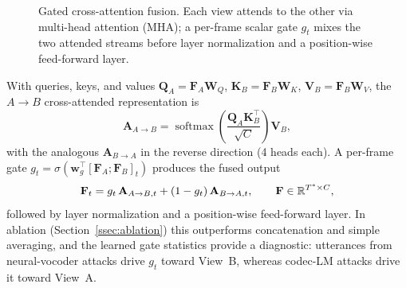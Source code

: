 \begin{figure}[t]
\centering
{}
\caption{Gated cross-attention fusion. Each view attends to the other via multi-head
attention (MHA); a per-frame scalar gate $g_t$ mixes the two attended streams before
layer normalization and a position-wise feed-forward layer.}
\label{fig:fusion}
\end{figure}

With queries, keys, and values $\mathbf{Q}_A = \mathbf{F}_A \mathbf{W}_Q$,
$\mathbf{K}_B = \mathbf{F}_B \mathbf{W}_K$, $\mathbf{V}_B = \mathbf{F}_B \mathbf{W}_V$,
the $A{\to}B$ cross-attended representation is
\begin{equation}
\mathbf{A}_{A \rightarrow B} = \operatorname{softmax}\!\left(
    \frac{\mathbf{Q}_A \mathbf{K}_B^\top}{\sqrt{C}}\right) \mathbf{V}_B ,
\end{equation}
with the analogous $\mathbf{A}_{B \rightarrow A}$ in the reverse direction (4 heads
each). A per-frame gate
$g_t = \sigma(\mathbf{w}_g^\top [\mathbf{F}_A; \mathbf{F}_B]_t)$ produces the fused
output
\begin{equation}
\mathbf{F}_t = g_t \, \mathbf{A}_{A \rightarrow B, t} + (1 - g_t)\,
\mathbf{A}_{B \rightarrow A, t}, \qquad \mathbf{F} \in \mathbb{R}^{T^* \times C},
\end{equation}
followed by layer normalization and a position-wise feed-forward layer. In ablation
(Section~\ref{ssec:ablation}) this outperforms concatenation and simple averaging, and
the learned gate statistics provide a diagnostic: utterances from neural-vocoder
attacks drive $g_t$ toward View~B, whereas codec-LM attacks drive it toward View~A.

